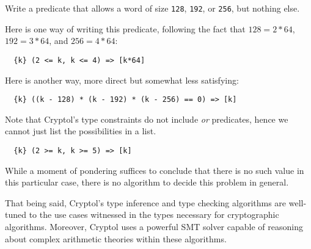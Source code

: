 \begin{Exercise}\label{ex:preds:1}
  Write a predicate that allows a word of size {\tt 128}, {\tt 192},
  or {\tt 256}, but nothing else.
\end{Exercise}
\begin{Answer}\indPredicates
  Here is one way of writing this predicate, following the fact that
  $128 = 2 * 64$, $192 = 3 * 64$, and $256 = 4 * 64$:
\begin{Verbatim}
  {k} (2 <= k, k <= 4) => [k*64]
\end{Verbatim}
Here is another way, more direct but somewhat less satisfying:
\begin{Verbatim}
  {k} ((k - 128) * (k - 192) * (k - 256) == 0) => [k]
\end{Verbatim}
Note that Cryptol's type constraints do not include {\em or} predicates,
hence we cannot just list the possibilities in a list.
\end{Answer}

\begin{Verbatim}
  {k} (2 >= k, k >= 5) => [k]
\end{Verbatim}
While a moment of pondering suffices to conclude that there is no such
value in this particular case, there is no algorithm to decide this
problem in general.

That being said, Cryptol's type inference and type checking algorithms
are well-tuned to the use cases witnessed in the types necessary for
cryptographic algorithms.  Moreover, Cryptol uses a powerful SMT
solver capable of reasoning about complex arithmetic theories within
these algorithms.


